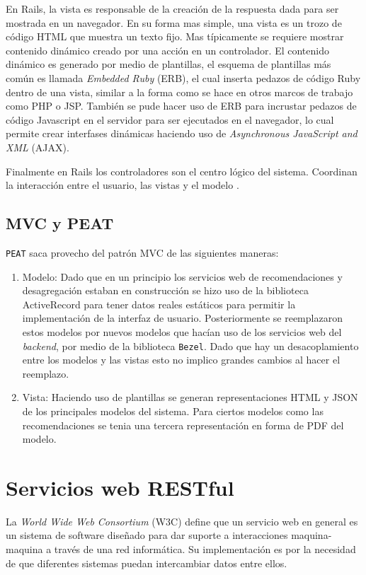 En Rails, la vista es responsable de la creación de la respuesta dada para
ser mostrada en un navegador. En su forma mas simple, una
vista es un trozo de código HTML que muestra un texto fijo. Mas típicamente
se requiere mostrar contenido dinámico creado por una acción en un controlador.
El contenido dinámico es generado por medio de plantillas, el esquema
de plantillas más común es llamada \textit{Embedded Ruby} (ERB),
el cual inserta pedazos de código Ruby dentro de una vista, similar a la forma
como se hace en otros marcos de trabajo como PHP o JSP. También se pude hacer uso de
ERB para incrustar pedazos de código Javascript en el servidor
para ser ejecutados en el navegador, lo cual permite crear interfases
dinámicas haciendo uso de \textit{Asynchronous JavaScript and XML} (AJAX).

Finalmente en Rails los controladores son el centro lógico del sistema. Coordinan
la interacción entre el usuario, las vistas y el modelo
\cite[pag.~29]{15_agile_hansson}.

\subsection{MVC y PEAT}
\texttt{PEAT} saca provecho del patrón MVC de las siguientes maneras:

\begin{enumerate}
\item Modelo: Dado que en un principio los servicios web de recomendaciones y
  desagregación estaban en construcción se hizo uso de la biblioteca ActiveRecord
  para tener datos reales estáticos para permitir la implementación
  de la interfaz de usuario. Posteriormente se reemplazaron estos modelos
  por nuevos modelos que hacían uso de los servicios web del \textit{backend},
  por medio de la biblioteca \texttt{Bezel}. Dado que hay un desacoplamiento
  entre los modelos y las vistas esto no implico grandes cambios al hacer el
  reemplazo.
\item Vista: Haciendo uso de plantillas se generan representaciones HTML
  y JSON de los principales modelos del sistema. Para ciertos modelos como
  las recomendaciones se tenia una tercera representación en forma de PDF
  del modelo.
\end{enumerate}

\section{Servicios web RESTful}
La \textit{World Wide Web Consortium} (W3C) define que un servicio web
en general es un sistema de software diseñado para dar suporte a interacciones
maquina-maquina a través de una red informática. Su implementación es por la
necesidad de que diferentes sistemas puedan intercambiar datos entre ellos.

